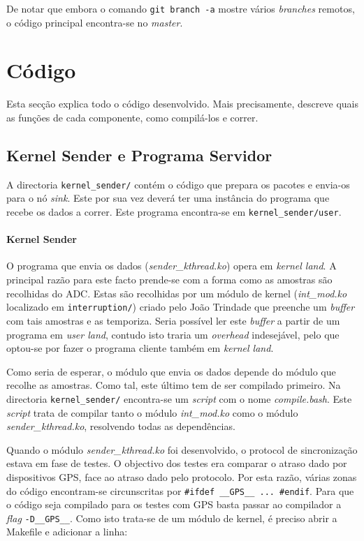 \documentclass[10pt,a4paper,oneside]{book}
\begin{document}
De notar que embora o comando {\tt git branch -a} mostre vários \emph{branches} remotos, o código principal encontra-se no \emph{master}.

\chapter{Código}

 Esta secção explica todo o código desenvolvido. Mais precisamente, descreve quais as funções de cada componente, como compilá-los e correr.

  \section{Kernel Sender e Programa Servidor}
  
  A directoria {\tt kernel\_sender/} contém o código que prepara os pacotes e envia-os para o nó \emph{sink}. Este por sua vez deverá ter uma instância do programa que recebe os dados a correr. Este programa encontra-se em {\tt kernel\_sender/user}.

  \subsubsection{Kernel Sender}\label{sec:sender}

    O programa que envia os dados (\emph{sender\_kthread.ko}) opera em \emph{kernel land}. A principal razão para este facto prende-se com a forma como as amostras são recolhidas do ADC. Estas são recolhidas por um módulo de kernel (\emph{int\_mod.ko} localizado em {\tt interruption/}) criado pelo João Trindade que preenche um \emph{buffer} com tais amostras e as temporiza. Seria possível ler este \emph{buffer} a partir de um programa em \emph{user land}, contudo isto traria um \emph{overhead} indesejável, pelo que optou-se por fazer o programa cliente também em \emph{kernel land}.

    Como seria de esperar, o módulo que envia os dados depende do módulo que recolhe as amostras. Como tal, este último tem de ser compilado primeiro. Na directoria {\tt kernel\_sender/} encontra-se um \emph{script} com o nome \emph{compile.bash}. Este \emph{script} trata de compilar tanto o módulo \emph{int\_mod.ko} como o módulo \emph{sender\_kthread.ko}, resolvendo todas as dependências.

    Quando o módulo \emph{sender\_kthread.ko} foi desenvolvido, o protocol de sincronização estava em fase de testes. O objectivo dos testes era comparar o atraso dado por dispositivos GPS, face ao atraso dado pelo protocolo. Por esta razão, várias zonas do código encontram-se circunscritas por {\tt \#ifdef \_\_GPS\_\_ ... \#endif}. Para que o código seja compilado para os testes com GPS basta passar ao compilador a \emph{flag} {\tt -D\_\_GPS\_\_}. Como isto trata-se de um módulo de kernel, é preciso abrir a Makefile e adicionar a linha:
\end{document}
